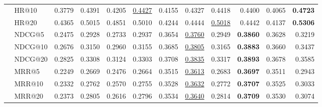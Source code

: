 \begin{tabular}{llrrrrrrrrrr}
 & HR@10 & 0.3779 & 0.4391 & 0.4205 & \underline{0.4427} & 0.4155 & 0.4327 & 0.4418 & 0.4400 & 0.4065 & \textbf{0.4723} \\
 & HR@20 & 0.4365 & 0.5015 & 0.4851 & 0.5010 & 0.4244 & 0.4444 & \underline{0.5018} & 0.4442 & 0.4137 & \textbf{0.5306} \\
 & NDCG@5 & 0.2475 & 0.2928 & 0.2733 & 0.2937 & 0.3654 & \underline{0.3760} & 0.2949 & \textbf{0.3860} & 0.3628 & 0.3219 \\
 & NDCG@10 & 0.2676 & 0.3150 & 0.2960 & 0.3155 & 0.3685 & \underline{0.3805} & 0.3165 & \textbf{0.3883} & 0.3660 & 0.3437 \\
 & NDCG@20 & 0.2825 & 0.3308 & 0.3124 & 0.3303 & 0.3708 & \underline{0.3835} & 0.3317 & \textbf{0.3893} & 0.3678 & 0.3585 \\
 & MRR@5 & 0.2249 & 0.2669 & 0.2476 & 0.2664 & 0.3515 & \underline{0.3613} & 0.2683 & \textbf{0.3697} & 0.3511 & 0.2943 \\
 & MRR@10 & 0.2332 & 0.2762 & 0.2570 & 0.2755 & 0.3528 & \underline{0.3632} & 0.2772 & \textbf{0.3707} & 0.3525 & 0.3033 \\
 & MRR@20 & 0.2373 & 0.2805 & 0.2616 & 0.2796 & 0.3534 & \underline{0.3640} & 0.2814 & \textbf{0.3709} & 0.3530 & 0.3074 \\
\hline
\end{tabular}
